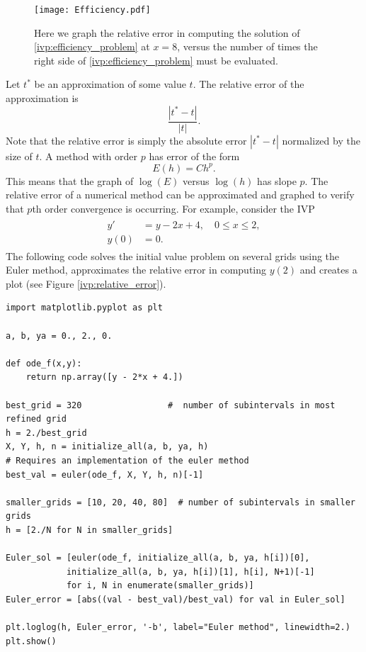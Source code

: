 \begin{figure}[ht]
\centering
\texttt{[image: Efficiency.pdf]}
\caption{Here we graph the relative error in computing the solution of \eqref{ivp:efficiency_problem} at $x = 8$, versus the number of times the right side of \eqref{ivp:efficiency_problem} must be evaluated.  }
\label{ivp:efficiency_figure}
\end{figure}




Let $t^*$ be an approximation of some value $t$. The relative error of the approximation is 
\[ \frac{|t^*-t|}{|t|}.
\]
Note that the relative error is simply the absolute error $|t^*-t|$ normalized by the size of $t$.  A method with order $p$ has error of the form 
\[E(h) = C h^p. \]
This means that the graph of $\log (E)$ versus $\log(h)$ has slope $p$.  
The relative error of a numerical method can be approximated and graphed to verify that $p$th order convergence is occurring. For example, consider the IVP
 \begin{align}
 	\begin{split}
 y' &= y - 2x + 4,\quad 0 \leq x \leq 2, \\
 y(0) &= 0.
 	\end{split} \label{ivp:prob2}
 \end{align}
The following code solves the initial value problem on several grids using the Euler method, approximates the relative error in computing $y(2)$ and creates a plot (see Figure \ref{ivp:relative_error}).

\begin{lstlisting}
import matplotlib.pyplot as plt

a, b, ya = 0., 2., 0.

def ode_f(x,y):
	return np.array([y - 2*x + 4.])
	
best_grid = 320					#  number of subintervals in most refined grid
h = 2./best_grid
X, Y, h, n = initialize_all(a, b, ya, h)
# Requires an implementation of the euler method
best_val = euler(ode_f, X, Y, h, n)[-1]  

smaller_grids = [10, 20, 40, 80]  # number of subintervals in smaller grids
h = [2./N for N in smaller_grids]

Euler_sol = [euler(ode_f, initialize_all(a, b, ya, h[i])[0],
			initialize_all(a, b, ya, h[i])[1], h[i], N+1)[-1]
			for i, N in enumerate(smaller_grids)]
Euler_error = [abs((val - best_val)/best_val) for val in Euler_sol]
	
plt.loglog(h, Euler_error, '-b', label="Euler method", linewidth=2.)
plt.show()

\end{lstlisting}


